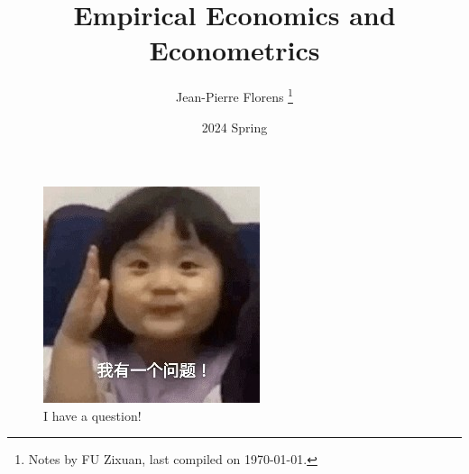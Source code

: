 \documentclass[12pt]{article}
\title{Empirical Economics and Econometrics }
\author{Jean-Pierre Florens \thanks{Notes by FU Zixuan, last compiled on \today.}}
\date{2024 Spring}
\begin{document}
\maketitle

\begin{figure}[h]
    \centering
    \includegraphics{figures/ihaveaquestion.jpg}
    \caption*{I have a question!}
\end{figure}

\newpage
\tableofcontents
\newpage
\pagestyle{fancy}






\newpage
\end{document}
